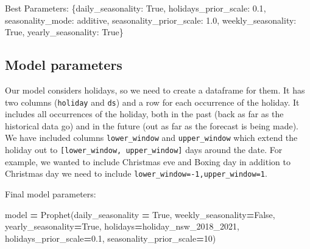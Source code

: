 \documentclass[mstat,12pt]{unswthesis}
\newenvironment{Shaded}{\begin{snugshade}}{\end{snugshade}}
\newcommand{\DecValTok}[1]{\textcolor[rgb]{0.00,0.00,0.81}{#1}}
\newcommand{\FloatTok}[1]{\textcolor[rgb]{0.00,0.00,0.81}{#1}}
\newcommand{\NormalTok}[1]{#1}
\newcommand{\OperatorTok}[1]{\textcolor[rgb]{0.81,0.36,0.00}{\textbf{#1}}}
\newcommand{\StringTok}[1]{\textcolor[rgb]{0.31,0.60,0.02}{#1}}
\newcommand{\VariableTok}[1]{\textcolor[rgb]{0.00,0.00,0.00}{#1}}
\begin{document}
\begin{Shaded}
\begin{Highlighting}[]
\NormalTok{Best Parameters: \{}\StringTok{\textquotesingle{}daily\_seasonality\textquotesingle{}}\NormalTok{: }\VariableTok{True}\NormalTok{, }
                  \StringTok{\textquotesingle{}holidays\_prior\_scale\textquotesingle{}}\NormalTok{: }\FloatTok{0.1}\NormalTok{, }
                  \StringTok{\textquotesingle{}seasonality\_mode\textquotesingle{}}\NormalTok{: }\StringTok{\textquotesingle{}additive\textquotesingle{}}\NormalTok{, }
                  \StringTok{\textquotesingle{}seasonality\_prior\_scale\textquotesingle{}}\NormalTok{: }\FloatTok{1.0}\NormalTok{, }
                  \StringTok{\textquotesingle{}weekly\_seasonality\textquotesingle{}}\NormalTok{: }\VariableTok{True}\NormalTok{, }
                  \StringTok{\textquotesingle{}yearly\_seasonality\textquotesingle{}}\NormalTok{: }\VariableTok{True}\NormalTok{\}}
\end{Highlighting}
\end{Shaded}

\hypertarget{model-parameters}{%
\subsection{Model parameters}\label{model-parameters}}

Our model considers holidays, so we need to create a dataframe for them.
It has two columns (\texttt{holiday} and \texttt{ds}) and a row for each
occurrence of the holiday. It includes all occurrences of the holiday,
both in the past (back as far as the historical data go) and in the
future (out as far as the forecast is being made). We have included
columns \texttt{lower\_window} and \texttt{upper\_window} which extend
the holiday out to \texttt{{[}lower\_window,\ upper\_window{]}} days
around the date. For example, we wanted to include Christmas eve and
Boxing day in addition to Christmas day we need to include
\texttt{lower\_window=-1,upper\_window=1}.

Final model parameters:

\begin{Shaded}
\begin{Highlighting}[]
\NormalTok{model }\OperatorTok{=}\NormalTok{ Prophet(daily\_seasonality }\OperatorTok{=} \VariableTok{True}\NormalTok{, }
\NormalTok{                weekly\_seasonality}\OperatorTok{=}\VariableTok{False}\NormalTok{, }
\NormalTok{                yearly\_seasonality}\OperatorTok{=}\VariableTok{True}\NormalTok{,   }
\NormalTok{                holidays}\OperatorTok{=}\NormalTok{holiday\_nsw\_2018\_2021, }
\NormalTok{                holidays\_prior\_scale}\OperatorTok{=}\FloatTok{0.1}\NormalTok{, }
\NormalTok{                seasonality\_prior\_scale}\OperatorTok{=}\DecValTok{10}\NormalTok{)}
\end{Highlighting}
\end{Shaded}
\end{document}

